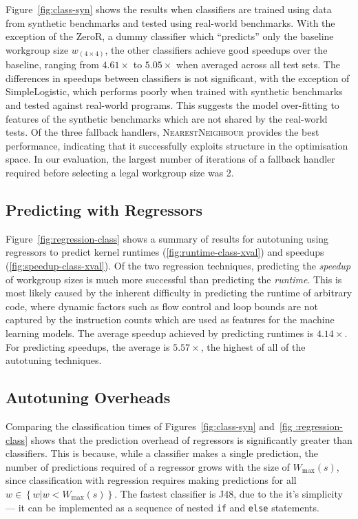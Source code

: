 \documentclass[preprint,nonatbib,10pt,nocopyrightspace]{sigplanconf}
\begin{document}
Figure~\ref{fig:class-syn} shows the results when classifiers are trained using
data from synthetic benchmarks and tested using real-world benchmarks. With the
exception of the ZeroR, a dummy classifier which ``predicts'' only the baseline
workgroup size $w_{\left( 4 \times 4 \right)}$, the other classifiers achieve
good speedups over the baseline, ranging from $4.61\times$ to $5.05\times$ when
averaged across all test sets. The differences in speedups between classifiers
is not significant, with the exception of SimpleLogistic, which performs poorly
when trained with synthetic benchmarks and tested against real-world programs.
This suggests the model over-fitting to features of the synthetic benchmarks
which are not shared by the real-world tests. Of the three fallback handlers,
\textsc{NearestNeighbour} provides the best performance, indicating
that it successfully exploits structure in the optimisation space. In
our evaluation, the largest number of iterations of a fallback handler
required before selecting a legal workgroup size was 2.


\subsection{Predicting with Regressors}

Figure~\ref{fig:regression-class} shows a summary of results for autotuning
using regressors to predict kernel runtimes (\ref{fig:runtime-class-xval}) and
speedups (\ref{fig:speedup-class-xval}). Of the two regression techniques,
predicting the \emph{speedup} of workgroup sizes is much more successful than
predicting the \emph{runtime}. This is most likely caused by the inherent
difficulty in predicting the runtime of arbitrary code, where dynamic factors
such as flow control and loop bounds are not captured by the instruction counts
which are used as features for the machine learning models. The average speedup
achieved by predicting runtimes is $4.14\times$. For predicting speedups, the
average is $5.57\times$, the highest of all of the autotuning techniques.

\subsection{Autotuning Overheads}

Comparing the classification times of Figures~\ref{fig:class-syn} and~\ref{fig
:regression-class} shows that the prediction overhead of regressors is
significantly greater than classifiers. This is because, while a classifier
makes a single prediction, the number of predictions required of a regressor
grows with the size of $W_{\max}(s)$, since classification with regression
requires making predictions for all $w \in \left\{ w | w < W_{\max}(s)
\right\}$. The fastest classifier is J48, due to the it's simplicity --- it can
be implemented as a sequence of nested \texttt{if} and \texttt{else} statements.
\end{document}
